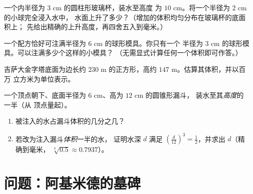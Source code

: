 \begin{exercise}[$\star\star$]\label{exo:g9:solids:6}
一个内半径为 $3$ cm 的圆柱形玻璃杯，装水至高度
为 $10$ cm。将一个半径为 $2$ cm 的小球完全浸入水中，
水面上升了多少？（增加的体积均匀分布在玻璃杯的底面积上；
先给出精确的上升高度，再四舍五入到毫米。）
\end{exercise}

\begin{exercise}[$\star\star$]\label{exo:g9:solids:7}
一个配方恰好可注满半径为 $6$ cm 的球形模具。你只有一个
半径为 $3$ cm 的球形模具。可以注满多少个这样的小模具？
（无需显式计算任何一个体积即可作答。）
\end{exercise}

\begin{exercise}[$\star\star$]\label{exo:g9:solids:8}
吉萨大金字塔底面为边长约 $230$ m 的正方形，高约
$147$ m。估算其体积，并以百万
立方米为单位表示。
\end{exercise}

\begin{exercise}[$\star\star\star$]\label{exo:g9:solids:9}
一个顶点朝下、底面半径为 $6$ cm、高为 $12$ cm 的圆锥形漏斗，
装水至其\emph{高度}的一半（从
顶点量起）。
\begin{enumerate}
  \item 被注入的水占漏斗体积的几分之几？
  \item 若改为注入漏斗\emph{体积}一半的水，
        证明水深 $d$ 满足
        $\left(\frac{d}{12}\right)^3 = \frac12$，并求出 $d$（精确到毫米，
        $\sqrt[3]{0.5} \approx 0.7937$）。
\end{enumerate}
\end{exercise}

\section{问题：阿基米德的墓碑}


